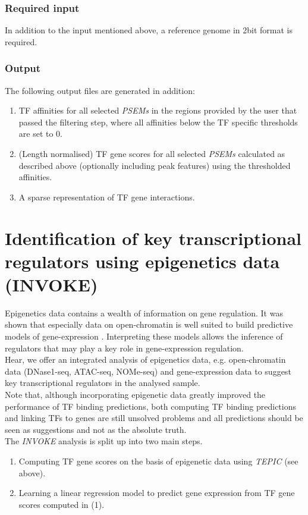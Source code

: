 \documentclass{article}
\begin{document}
\subsubsection*{Required input}
In addition to the input mentioned above, a reference genome in 2bit format is required. 

\subsubsection*{Output}
The following output files are generated in addition:
\begin{enumerate}
\item TF affinities for all selected \textit{PSEMs} in the regions provided by the user that passed the filtering step, where all affinities below the TF specific thresholds are set to 0.
\item (Length normalised) TF gene scores for all selected \textit{PSEMs} calculated as described above (optionally including peak features) using the thresholded affinities.
\item A sparse representation of TF gene interactions.
\end{enumerate}

\newpage
\mbox{}
\newpage
\section*{Identification of key transcriptional regulators using epigenetics data (INVOKE)}
Epigenetics data contains a wealth of information on gene regulation. It was shown that especially
data on open-chromatin is well suited to build predictive models of gene-expression \cite{pmid27899623,pmid22955983,pmid25231769,pmid22954627}.
Interpreting these models allows the inference of regulators that may play a key role in gene-expression regulation.
\bigskip
\\Hear, we offer an integrated analysis of epigenetics data, e.g. open-chromatin data (DNase1-seq, ATAC-seq, NOMe-seq) and gene-expression data
to suggest key transcriptional regulators in the analysed sample.
\bigskip
\\Note that, although incorporating epigenetic data greatly improved the performance of TF binding predictions, both computing TF binding predictions and linking TFs to genes are still unsolved problems and all predictions
should be seen as suggestions and not as the absolute truth.
\bigskip
\\The \textit{INVOKE} analysis is split up into two main steps. 
\begin{enumerate}
\item Computing TF gene scores on the basis of epigenetic data using \textit{TEPIC} (see above).
\item Learning a linear regression model to predict gene expression from TF gene scores computed in (1).
\end{enumerate}
\end{document}
